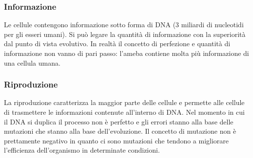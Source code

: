 \subsubsection{Informazione}
Le cellule contengono informazione sotto forma di DNA ($3$ miliardi di nucleotidi per gli esseri umani). Si pu\`o legare la quantit\`a di informazione con la superiorit\`a dal punto di 
vista evolutivo. In realt\`a il concetto di perfezione e quantit\`a di informazione non vanno di pari passo: l'ameba contiene molta pi\`u informazione di una cellula umana. 
\subsubsection{Riproduzione}
La riproduzione caratterizza la maggior parte delle cellule e permette alle cellule di trasmettere le informazioni contenute all'interno di DNA. Nel momento in cui il DNA si duplica il 
processo non \`e perfetto e gli errori stanno alla base delle mutazioni che stanno alla base dell'evoluzione. Il concetto di mutazione non \`e prettamente negativo in quanto ci sono 
mutazioni che tendono a migliorare l'efficienza dell'organismo in determinate condizioni.
